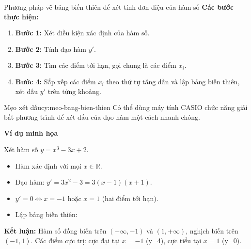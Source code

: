 


\begin{lythuyetbox}{Phương pháp vẽ bảng biến thiên để xét tính đơn điệu của hàm số}
\textbf{Các bước thực hiện:}

\begin{enumerate}
    \item \textbf{Bước 1:} Xét điều kiện xác định của hàm số.
    \item \textbf{Bước 2:} Tính đạo hàm $y'$.
    \item \textbf{Bước 3:} Tìm các điểm tới hạn, gọi chung là các điểm $x_i$.
    \item \textbf{Bước 4:} Sắp xếp các điểm $x_i$ theo thứ tự tăng dần và lập bảng biến thiên, xét dấu $y'$ trên từng khoảng.
\end{enumerate}

\begin{chuy}{Mẹo xét dấu}{cy:meo-bang-bien-thien}
    Có thể dùng máy tính CASIO chức năng giải bất phương trình để xét dấu của đạo hàm một cách nhanh chóng.
\end{chuy}

\textbf{Ví dụ minh họa}

Xét hàm số $y = x^3 - 3x + 2$.

\begin{itemize}
    \item Hàm xác định với mọi $x \in \mathbb{R}$.
    \item Đạo hàm: $y' = 3x^2 - 3 = 3(x-1)(x+1)$.
    \item $y' = 0 \Leftrightarrow x = -1$ hoặc $x = 1$ (hai điểm tới hạn).
    \item Lập bảng biến thiên:
\end{itemize}

\begin{center}
\end{center}

\textbf{Kết luận:} Hàm số đồng biến trên $(-\infty, -1)$ và $(1, +\infty)$, nghịch biến trên $(-1, 1)$. Các điểm cực trị: cực đại tại $x = -1$ (y=4), cực tiểu tại $x = 1$ (y=0).

\end{lythuyetbox}

